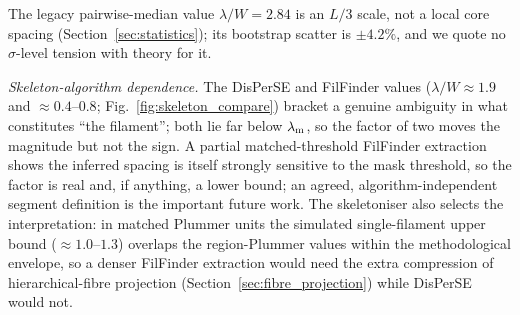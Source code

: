 \documentclass[usenatbib,twoside,twocolumn]{mnras}
\begin{document}
The legacy pairwise-median value $\lambda/W=2.84$ is an $L/3$ scale, not a local core spacing (Section~\ref{sec:statistics}); its bootstrap scatter is $\pm4.2\%$, and we quote no $\sigma$-level tension with theory for it.

\emph{Skeleton-algorithm dependence.} The DisPerSE and FilFinder values ($\lambda/W\approx1.9$ and $\approx0.4$--$0.8$; Fig.~\ref{fig:skeleton_compare}) bracket a genuine ambiguity in what constitutes ``the filament''; both lie far below $\lambda_{\rm m}$, so the factor of two moves the magnitude but not the sign. A partial matched-threshold FilFinder extraction shows the inferred spacing is itself strongly sensitive to the mask threshold, so the factor is real and, if anything, a lower bound; an agreed, algorithm-independent segment definition is the important future work. The skeletoniser also selects the interpretation: in matched Plummer units the simulated single-filament upper bound ($\approx1.0$--$1.3$) overlaps the region-Plummer values within the methodological envelope, so a denser FilFinder extraction would need the extra compression of hierarchical-fibre projection (Section~\ref{sec:fibre_projection}) while DisPerSE would not.
\end{document}
